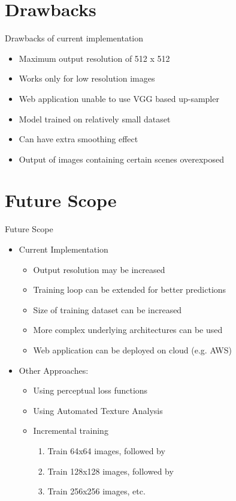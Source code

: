 \documentclass{beamer}
\begin{document}
\section{Drawbacks}
	\begin{frame}{Drawbacks of current implementation}
		\begin{itemize}
			\item Maximum output resolution of 512 x 512
			\item Works only for low resolution images
			\item Web application unable to use VGG based up-sampler
			\item Model trained on relatively small dataset
			\item Can have extra smoothing effect
			\item Output of images containing certain scenes overexposed
		\end{itemize}
	\end{frame}



\section{Future Scope}
	\begin{frame}{Future Scope}
		\begin{itemize}
			\item Current Implementation
			\begin{itemize}
				\item Output resolution may be increased
				\item Training loop can be extended for better predictions
				\item Size of training dataset can be increased
				\item More complex underlying architectures can be used
				\item Web application can be deployed on cloud (e.g. AWS)
			\end{itemize}
			\item Other Approaches:
			\begin{itemize}
				\item Using perceptual loss functions
				\item Using Automated Texture Analysis
				\item Incremental training
					\begin{enumerate}
						\item Train 64x64 images, followed by
						\item Train 128x128 images, followed by
						\item Train 256x256 images, etc.
					\end{enumerate}
			\end{itemize}
		\end{itemize}
	\end{frame}
\end{document}

